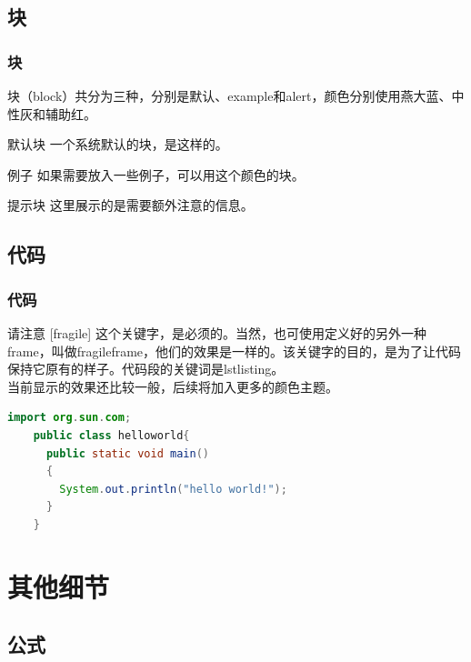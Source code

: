 \documentclass[aspectratio=169,UTF8,t]{beamer}%
\begin{document}
\subsection{块}

\begin{frame}
    \frametitle{块}
    块（block）共分为三种，分别是默认、example和alert，颜色分别使用燕大蓝、中性灰和辅助红。
    \begin{block}{默认块}
        一个系统默认的块，是这样的。
    \end{block}

    \begin{exampleblock}{例子}
        如果需要放入一些例子，可以用这个颜色的块。
    \end{exampleblock}

    \begin{alertblock}{提示块}
        这里展示的是需要额外注意的信息。
    \end{alertblock}
\end{frame}

\subsection{代码}

\begin{frame}[fragile]
    \frametitle{代码}
    
    请注意 [fragile] 这个关键字，是必须的。当然，也可使用定义好的另外一种frame，叫做fragileframe，他们的效果是一样的。该关键字的目的，是为了让代码保持它原有的样子。代码段的关键词是lstlisting。\\
    当前显示的效果还比较一般，后续将加入更多的颜色主题。

\begin{lstlisting}[language=Java,caption={src/app/app.module.ts}]
    import org.sun.com;   
    public class helloworld{
      public static void main()
      {
        System.out.println("hello world!");
      }
    }
    \end{lstlisting}
\end{frame}

\section{其他细节}

\subsection{公式}
\end{document}
